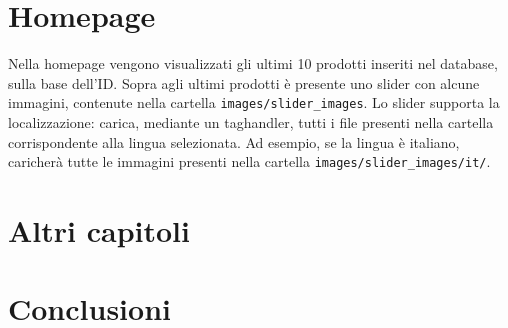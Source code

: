 \chapter{Homepage}
Nella homepage vengono visualizzati gli ultimi 10 prodotti inseriti nel database, sulla base dell'ID. Sopra agli ultimi prodotti è presente uno slider con alcune immagini, contenute nella cartella \texttt{images/slider_images}. Lo slider supporta la localizzazione: carica, mediante un taghandler, tutti i file presenti nella cartella corrispondente alla lingua selezionata. Ad esempio, se la lingua è italiano, caricherà tutte le immagini presenti nella cartella \texttt{images/slider_images/it/}.

\chapter{Altri capitoli}
\chapter{Conclusioni}

